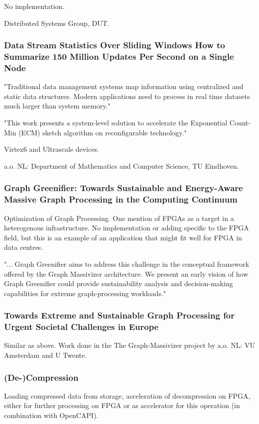 No implementation.

Distributed Systems Group, DUT.

\subsubsection{Data Stream Statistics Over Sliding Windows How to Summarize 150 Million Updates Per Second on a Single Node}
\cite{Chrysos2019DataNode}
"Traditional data management systems map information
using centralized and static data structures. Modern
applications need to process in real time datasets much larger
than system memory."

"This work presents a system-level solution to accelerate the Exponential
Count-Min (ECM) sketch algorithm on reconfigurable
technology."

Virtex6 and Ultrascale devices.

a.o. NL: Department of Mathematics and Computer Science, TU Eindhoven.

\subsubsection{Graph Greenifier: Towards Sustainable and Energy-Aware Massive Graph Processing in the Computing Continuum}
\cite{Iosup2023GraphContinuum}
Optimization of Graph Processing. 
One mention of FPGAs as a target in a heterogenous infrastructure.
No implementation or adding specific to the FPGA field, but this is an example of an application that might fit well for FPGA in data centres.

"... Graph Greenifier aims
to address this challenge in the conceptual framework offered by
the Graph Massivizer architecture. We present an early vision of
how Graph Greenifier could provide sustainability analysis and
decision-making capabilities for extreme graph-processing workloads."

\subsubsection{Towards Extreme and Sustainable Graph Processing for Urgent Societal Challenges in Europe}
\cite{Prodan2022TowardsEurope}
Similar as above. Work done in the The Graph-Massivizer project by a.o. NL: VU Amsterdam and U Twente.


\subsubsection{(De-)Compression}
Loading compressed data from storage, acceleration of decompression on FPGA, either for further processing on FPGA or as accelerator for this operation (in combination with OpenCAPI).

